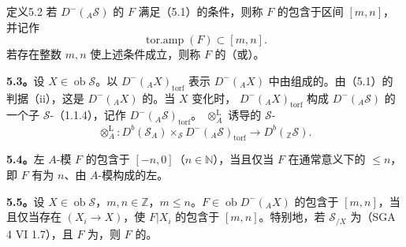 \begin{SGAresult}{定义}{5.2}
若 $D^-({}_A\mathscr S)$ 的 $F$ 满足（5.1）的条件，则称 $F$ 的包含于区间 $[m,n]$，并记作
\[\operatorname{tor.amp}(F)\subset[m,n].\]
若存在整数 $m,n$ 使上述条件成立，则称 $F$ 的（或）。
\end{SGAresult}

\textbf{5.3。}设 $X\in\operatorname{ob}\mathscr S$。以 $D^-({}_AX)_{\mathrm{torf}}$ 表示 $D^-({}_AX)$ 中由组成的。由（5.1）的判据（ii），这是 $D^-({}_AX)$ 的。当 $X$ 变化时， $D^-({}_AX)_{\mathrm{torf}}$ 构成 $D^-({}_A\mathscr S)$ 的一个子 $\mathscr S$-（1.1.4），记作 $D^-({}_A\mathscr S)_{\mathrm{torf}}$。 $\otimes_A^{\mathrm L}$ 诱导的 $\mathscr S$-
\[\otimes_A^{\mathrm L}:D^b(\mathscr S_A)\times_{\mathscr S}D^-({}_A\mathscr S)_{\mathrm{torf}}\longrightarrow D^b({}_{\mathbb Z}\mathscr S).\]

\textbf{5.4。}左 $A$-模 $F$ 的包含于 $[-n,0]$（$n\in\mathbb N$），当且仅当 $F$ 在通常意义下的 $\leq n$，即 $F$ 有为 $n$、由 $A$-模构成的左。

\textbf{5.5。}设 $X\in\operatorname{ob}\mathscr S$，$m,n\in\mathbb Z$，$m\leq n$。$F\in\operatorname{ob}D^-({}_AX)$ 的包含于 $[m,n]$，当且仅当存在 $(X_i\to X)$，使 $F|X_i$ 的包含于 $[m,n]$。特别地，若 $\mathscr S_{/X}$ 为（SGA 4 VI 1.7），且 $F$ 为，则 $F$ 的。

